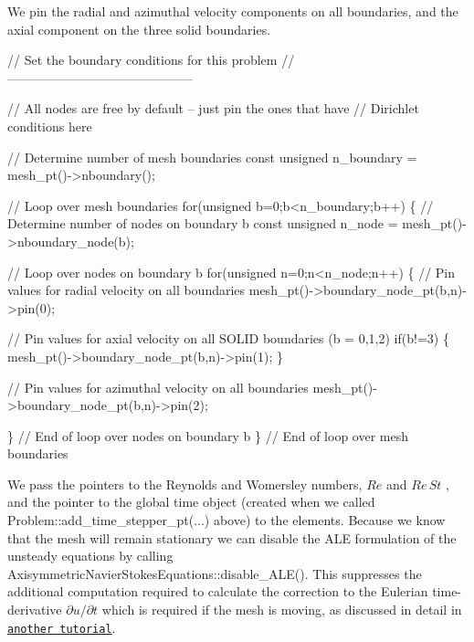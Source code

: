 We pin the radial and azimuthal velocity components on all boundaries, and the axial component on the three solid boundaries.


\begin{DoxyCodeInclude}
 \textcolor{comment}{// Set the boundary conditions for this problem}
 \textcolor{comment}{// --------------------------------------------}

 \textcolor{comment}{// All nodes are free by default -- just pin the ones that have}
 \textcolor{comment}{// Dirichlet conditions here}

 \textcolor{comment}{// Determine number of mesh boundaries}
 \textcolor{keyword}{const} \textcolor{keywordtype}{unsigned} n\_boundary = mesh\_pt()->nboundary();

 \textcolor{comment}{// Loop over mesh boundaries}
 \textcolor{keywordflow}{for}(\textcolor{keywordtype}{unsigned} b=0;b<n\_boundary;b++)
  \{
   \textcolor{comment}{// Determine number of nodes on boundary b}
   \textcolor{keyword}{const} \textcolor{keywordtype}{unsigned} n\_node = mesh\_pt()->nboundary\_node(b);

   \textcolor{comment}{// Loop over nodes on boundary b}
   \textcolor{keywordflow}{for}(\textcolor{keywordtype}{unsigned} n=0;n<n\_node;n++)
    \{
     \textcolor{comment}{// Pin values for radial velocity on all boundaries}
     mesh\_pt()->boundary\_node\_pt(b,n)->pin(0);

     \textcolor{comment}{// Pin values for axial velocity on all SOLID boundaries (b = 0,1,2)}
     \textcolor{keywordflow}{if}(b!=3) \{ mesh\_pt()->boundary\_node\_pt(b,n)->pin(1); \}

     \textcolor{comment}{// Pin values for azimuthal velocity on all boundaries}
     mesh\_pt()->boundary\_node\_pt(b,n)->pin(2);

    \} \textcolor{comment}{// End of loop over nodes on boundary b}
  \} \textcolor{comment}{// End of loop over mesh boundaries}

\end{DoxyCodeInclude}


We pass the pointers to the Reynolds and Womersley numbers, $ Re $ and $ Re\, St $ , and the pointer to the global time object (created when we called {\ttfamily Problem\+::add\+\_\+time\+\_\+stepper\+\_\+pt}(...) above) to the elements. Because we know that the mesh will remain stationary we can disable the A\+LE formulation of the unsteady equations by calling {\ttfamily Axisymmetric\+Navier\+Stokes\+Equations\+::disable\+\_\+\+A\+L\+E()}. This suppresses the additional computation required to calculate the correction to the Eulerian time-\/derivative $ \partial u /\partial t $ which is required if the mesh is moving, as discussed in detail in \href{../../../optimisation/html/index.html#ale}{\tt another tutorial}.


